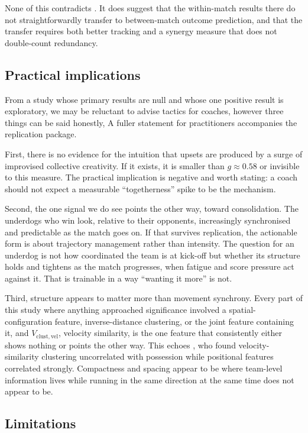 \documentclass[11pt,a4paper]{article}
\newcommand{\Vcv}{V_{\mathrm{clust,vel}}}
\begin{document}
None of this contradicts \cite{cheng2025}. It does suggest that the within-match results
there do not straightforwardly transfer to between-match outcome prediction, and that the
transfer requires both better tracking and a synergy measure that does not double-count
redundancy.

\subsection{Practical implications}

From a study whose primary results are
null and whose one positive result is exploratory, we may be reluctant to advise tactics for coaches, however three things can be said honestly, 
A fuller statement for practitioners accompanies the
replication package.

First, there is no evidence for the intuition that upsets are produced by a surge of
improvised collective creativity. If it exists, it is smaller than $g\approx0.58$ or
invisible to this measure. The practical implication is negative and worth stating: a coach
should not expect a measurable ``togetherness'' spike to be the mechanism.

Second, the one signal we do see points the other way, toward consolidation.
The underdogs who win look, relative to their opponents, increasingly synchronised and
predictable as the match goes on. If that survives replication, the actionable form is
about trajectory management rather than intensity. The question for an underdog is
not how coordinated the team is at kick-off but whether its structure holds and tightens
as the match progresses, when fatigue and score pressure act against it. That is
trainable in a way ``wanting it more'' is not.

Third, structure appears to matter more than movement synchrony. Every part of this
study where anything approached significance involved a spatial-configuration feature,
inverse-distance clustering, or the joint feature containing it, and $\Vcv$, velocity
similarity, is the one feature that consistently either shows nothing or points the other
way. This echoes \cite{cheng2025}, who found velocity-similarity clustering uncorrelated
with possession while positional features correlated strongly. Compactness and spacing
appear to be where team-level information lives while running in the same direction at the same
time does not appear to be.

\subsection{Limitations}
\end{document}
